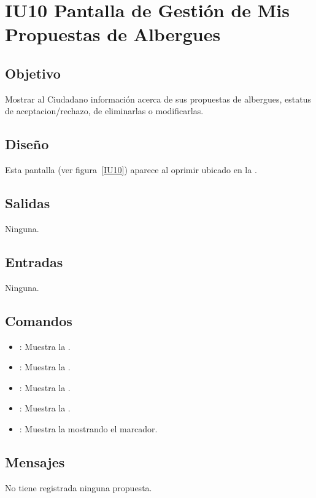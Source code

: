 \section{ IU10 Pantalla de Gestión de Mis Propuestas de Albergues}

\subsection{Objetivo}
	Mostrar al Ciudadano información acerca de sus propuestas de albergues, estatus de aceptacion/rechazo, de eliminarlas o modificarlas.

\subsection{Diseño}
	Esta pantalla  (ver figura~\ref{IU10}) aparece al oprimir  ubicado en la .
	

\subsection{Salidas}
	Ninguna.

\subsection{Entradas}
	Ninguna.

\subsection{Comandos}
\begin{itemize}
	\item {}: Muestra la .
	\item {}: Muestra la .
	\item {}: Muestra la . 
	\item {}: Muestra la .
	\item {}: Muestra la  mostrando el marcador.
\end{itemize}

\subsection{Mensajes}

\begin{Citemize}
	\item No tiene registrada ninguna propuesta.
\end{Citemize}

\clearpage